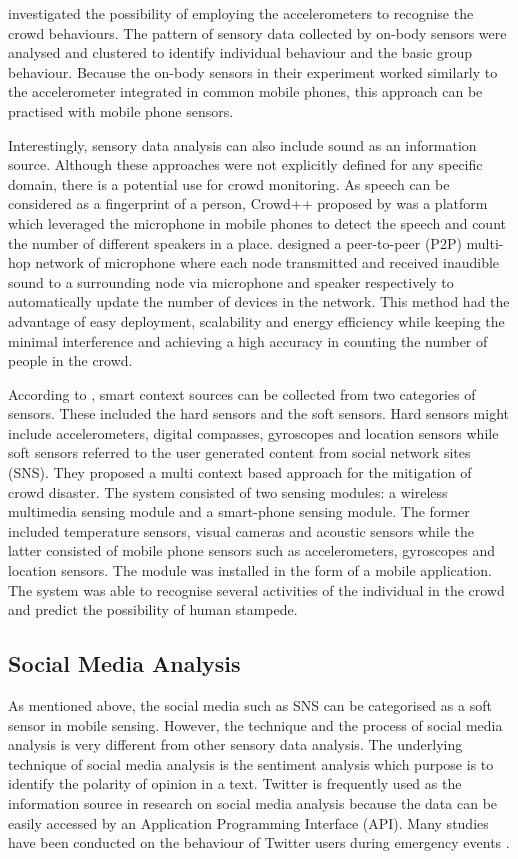 \citet{Roggen2011} investigated the possibility of employing the accelerometers to recognise the crowd behaviours. The pattern of sensory data collected by on-body sensors were analysed and clustered to identify individual behaviour and the basic group behaviour. Because the on-body sensors in their experiment worked similarly to the accelerometer integrated in common mobile phones, this approach can be practised with mobile phone sensors.

Interestingly, sensory data analysis can also include sound as an information source. Although these approaches were not explicitly defined for any specific domain, there is a potential use for crowd monitoring. As speech can be considered as a fingerprint of a person, Crowd++ proposed by \citet{Xu2013} was a platform which leveraged the microphone in mobile phones to detect the speech and count the number of different speakers in a place. \citet{Kannan2012} designed a peer-to-peer (P2P) multi-hop network of microphone where each node transmitted and received inaudible sound to a surrounding node via microphone and speaker respectively to automatically update the number of devices in the network. This method had the advantage of easy deployment, scalability and energy efficiency while keeping the minimal interference and achieving a high accuracy in counting the number of people in the crowd.

According to \citet{Ramesh2014}, smart context sources can be collected from two categories of sensors. These included the hard sensors and the soft sensors. Hard sensors might include accelerometers, digital compasses, gyroscopes and location sensors while soft sensors referred to the user generated content from social network sites (SNS). They proposed a multi context based approach for the mitigation of crowd disaster. The system consisted of two sensing modules: a wireless multimedia sensing module and a smart-phone sensing module. The former included temperature sensors, visual cameras and acoustic sensors while the latter consisted of mobile phone sensors such as accelerometers, gyroscopes and location sensors. The module was installed in the form of a mobile application. The system was able to recognise several activities of the individual in the crowd and predict the possibility of human stampede.

\subsection{Social Media Analysis}
As mentioned above, the social media such as SNS can be categorised as a soft sensor in mobile sensing. However, the technique and the process of social media analysis is very different from other sensory data analysis. The underlying technique of social media analysis is the sentiment analysis which purpose is to identify the polarity of opinion in a text. Twitter is frequently used as the information source in research on social media analysis because the data can be easily accessed by an Application Programming Interface (API). Many studies have been conducted on the behaviour of Twitter users during emergency events \citep{Hughes2009,Sakaki2010,Vieweg2010,Yin2012}.


